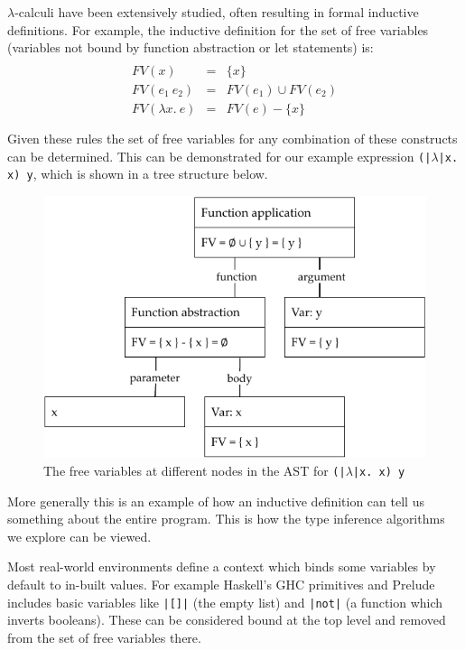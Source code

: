 \documentclass[a4paper,fleqn,oneside,12pt]{report}
\begin{document}
$\lambda$-calculi have been extensively studied, often resulting in formal inductive definitions. For example, the inductive definition for the set of free variables (variables not bound by function abstraction or let statements) is:
$$\begin{array}{lcl}
  \\
    FV(x)               & = & \{ x \}\\
    FV(e_1\ e_2)        & = & FV(e_1) \cup FV(e_2)\\
    FV(\lambda x.\ e  ) & = & FV(e) - \{ x \}\\
  \\
\end{array}$$
Given these rules the set of free variables for any combination of these constructs can be determined. This can be demonstrated for our example expression \texttt{(|$\lambda$|x. x) y}, which is shown in a tree structure below.

{\centering \begin{figure}[h!]
  \centering
  \includegraphics[width=0.8\linewidth]{images/ast_abs_id_y_fv.pdf}
  \caption{The free variables at different nodes in the AST for \texttt{(|$\lambda$|x. x) y}}
\end{figure} \par}

More generally this is an example of how an inductive definition can tell us something about the entire program. This is how the type inference algorithms we explore can be viewed.

Most real-world environments define a context which binds some variables by default to in-built values. For example Haskell’s GHC primitives and Prelude includes basic variables like \texttt{|[]|} (the empty list) and \texttt{|not|} (a function which inverts booleans). These can be considered bound at the top level and removed from the set of free variables there.
\end{document}
